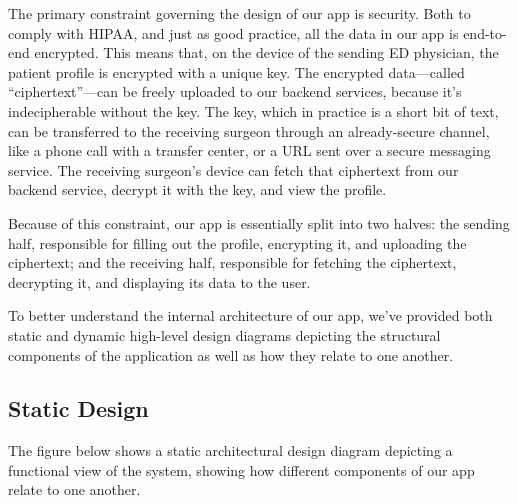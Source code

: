 \documentclass[11pt,letterpaper]{article}
\begin{document}
The primary constraint governing the design of our app is security. Both to comply with HIPAA, and just as good practice, all the data in our app is end-to-end encrypted. This means that, on the device of the sending ED physician, the patient profile is encrypted with a unique key. The encrypted data---called ``ciphertext''---can be freely uploaded to our backend services, because it's indecipherable without the key. The key, which in practice is a short bit of text, can be transferred to the receiving surgeon through an already-secure channel, like a phone call with a transfer center, or a URL sent over a secure messaging service. The receiving surgeon's device can fetch that ciphertext from our backend service, decrypt it with the key, and view the profile.

Because of this constraint, our app is essentially split into two halves: the sending half, responsible for filling out the profile, encrypting it, and uploading the ciphertext; and the receiving half, responsible for fetching the ciphertext, decrypting it, and displaying its data to the user.

To better understand the internal architecture of our app, we've provided both static and dynamic high-level design diagrams depicting the structural components of the application as well as how they relate to one another.


\subsection{Static Design}

The figure below shows a static architectural design diagram depicting a functional view of the system, showing how different components of our app relate to one another.
\end{document}
